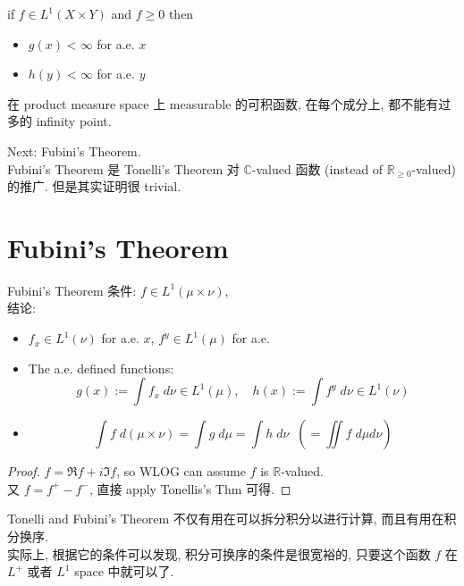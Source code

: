\documentclass[lang=cn,11pt]{elegantbook}
\begin{document}
\begin{corollary}
    if $f \in L^1(X\times Y)$ and $f \geq 0$ then 
    \begin{itemize}
        \item     $g(x) < \infty$ for a.e. $x$
        \item $h(y) < \infty$ for a.e. $y$
    \end{itemize}
\end{corollary}
\begin{remark}
    在 product measure space 上 measurable 的可积函数, 在每个成分上, 都不能有过多的 infinity point.
\end{remark}
Next: Fubini's Theorem.\\
Fubini's Theorem 是 Tonelli's Theorem 对 $\mathbb{C}$-valued 函数 (instead of $\mathbb{R}_{\geq 0}$-valued) 的推广. 但是其实证明很 trivial. 
\section{Fubini's Theorem}
\begin{theorem}{Fubini's Theorem}
 条件: $f \in L^1(\mu \times \nu)$,\\
 结论:
    \begin{itemize}
        \item $f_x \in L^1(\nu)$ for a.e. $x$, $f^y \in L^1(\mu)$ for a.e. 
        \item The a.e. defined functions: \[ g(x) := \int f_x \;d\nu \in L^1(\mu),\quad h(x) := \int f^y \;d\nu \in L^1(\nu) \]
        \item \[ \int f \; d(\mu \times \nu)  = \int g \; d\mu = \int h \; d\nu  \;\; (= \iint f\; d\mu d\nu)\]
    \end{itemize}
\end{theorem}
\begin{proof}
\(f = \Re f + i \Im f \), so WLOG can assume $f$ is $\mathbb{R}$-valued.\\
又 $f = f^+ - f^-$, 直接 apply Tonellis's Thm 可得.
\end{proof}
\begin{remark}
    Tonelli and Fubini's Theorem 不仅有用在可以拆分积分以进行计算, 而且有用在积分换序. \\
    实际上, 根据它的条件可以发现, 积分可换序的条件是很宽裕的, 只要这个函数 $f$ 在 $L^+$ 或者 $L^1$ space 中就可以了.
\end{remark}
\end{document}
